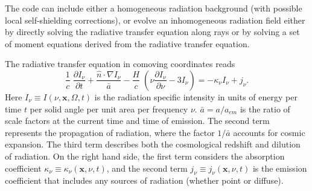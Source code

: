 The code can include either a homogeneous radiation background (with
possible local self-shielding corrections), or evolve an inhomogeneous
radiation field either by directly solving the radiative transfer
equation along rays or by solving a set of moment equations derived
from the radiative transfer equation.

The radiative transfer equation in comoving coordinates
\citep[e.g.,][]{Gnedin97} reads
%
\begin{equation}
  \label{eq:rteqn}
  \frac{1}{c} \; \frac{\partial I_\nu}{\partial t} + 
  \frac{\hat{n} \cdot \nabla I_\nu}{\bar{a}} -
  \frac{H}{c} \; \left( \nu \frac{\partial I_\nu}{\partial \nu} -
  3 I_\nu \right) = -\kappa_\nu I_\nu + j_\nu .
\end{equation}
%
Here $I_\nu \equiv I(\nu, \mathbf{x}, \Omega, t)$ is the radiation
specific intensity in units of energy per time $t$ per solid angle per
unit area per frequency $\nu$.  $\bar{a} = a/a_{em}$ is the ratio of
scale factors at the current time and time of emission.  The second
term represents the propagation of radiation, where the factor
$1/\bar{a}$ accounts for cosmic expansion.  The third term describes
both the cosmological redshift and dilution of radiation.  On the
right hand side, the first term considers the absorption coefficient
$\kappa_\nu \equiv \kappa_\nu(\mathbf{x},\nu,t)$, and the second term
$j_\nu \equiv j_\nu(\mathbf{x},\nu,t)$ is the emission coefficient
that includes any sources of radiation (whether point or diffuse).


